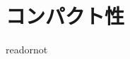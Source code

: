 \documentclass{jsarticle}
\begin{document}
\fi

\section{コンパクト性}

\expandafter\ifx\csname readornot\endcsname\relax
  
\end{document}
